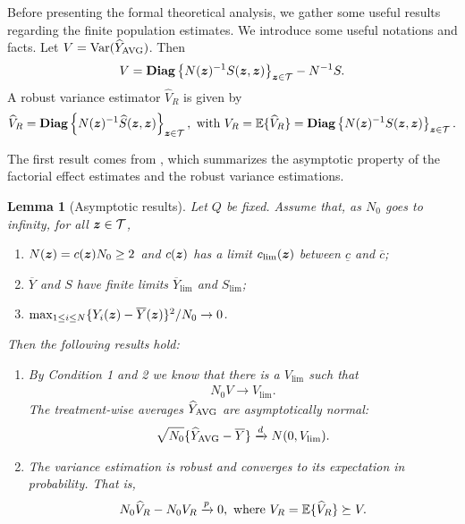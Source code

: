 \documentclass[12pt]{article}
\newtheorem{lemma}{Lemma}
\begin{document}
Before presenting the formal theoretical analysis, we gather some useful results regarding the finite population estimates. We introduce some useful notations and facts. Let $V = \operatorname{Var}({\widehat{Y}}_{\operatorname{AVG}})$. Then
\begin{align*}
    V = \text{\bfseries Diag}\left\{N({\boldsymbol{z}})^{-1}S({\boldsymbol{z}},{\boldsymbol{z}})\right\}_{{\boldsymbol{z}}\in{\mathcal{T}}} - N^{-1}S.
\end{align*}
A robust variance estimator $\hat{V}_R$ is given by 
\begin{align*}
    \widehat{V}_R = \text{\bfseries Diag}\left\{N({\boldsymbol{z}})^{-1}{\widehat{S}}({\boldsymbol{z}},{\boldsymbol{z}})\right\}_{{\boldsymbol{z}}\in{\mathcal{T}}},\text{ with } V_R = {\mathbb{E}}\{{\widehat{V}}_R\} = \text{\bfseries Diag}\left\{N({\boldsymbol{z}})^{-1} S({\boldsymbol{z}},{\boldsymbol{z}})\right\}_{{\boldsymbol{z}}\in{\mathcal{T}}}.
\end{align*}

The first result comes from \cite{li2017general, zhao2021regression}, which summarizes the asymptotic property of the factorial effect estimates and the robust variance estimations. 

\begin{lemma}[Asymptotic results]\label{lem:asp-results}
Let $Q$ be fixed. Assume that, as $N_0$ goes to infinity, for all ${\boldsymbol{z}} \in {\mathcal{T}}$,
\begin{enumerate}
    \item $N({\boldsymbol{z}}) = c({\boldsymbol{z}}) N_0 \ge 2$ and $c({\boldsymbol{z}})$ has a limit $c_{\lim}({\boldsymbol{z}})$ between $\underline{c}$ and $\overline{c}$;
    \item $\overline{Y}$ and $S$ have finite limits $\overline{Y}_{\lim}$ and $S_{\lim}$;
    \item ${\max_{1\le i\le N}\{Y_i({\boldsymbol{z}}) - \overline{Y}({\boldsymbol{z}})\}^2}/{N_0}\to 0$.
\end{enumerate}
Then the following results hold:
\begin{enumerate}
    \item By Condition 1 and 2 we know that there is a $V_{\lim}$ such that
    \begin{align*}
        N_0 V \to V_{\lim}.
    \end{align*}
    The treatment-wise averages ${\widehat{Y}}_{\operatorname{AVG}}$ are asymptotically normal:
    \begin{align*}
        \sqrt{N_0}\{{\widehat{Y}}_{\operatorname{AVG}} - \overline{Y}\} \xrightarrow{d} N(0, V_{\lim}).
    \end{align*}
    
    \item The variance estimation is robust and converges to its expectation in probability. That is,
    \begin{align*}
        N_0\widehat{V}_R - N_0V_R \xrightarrow{p} 0, \text{ where } V_R = {\mathbb{E}}\{\widehat{V}_R\} \succeq V.
    \end{align*}
\end{enumerate}
\end{lemma}
\end{document}
